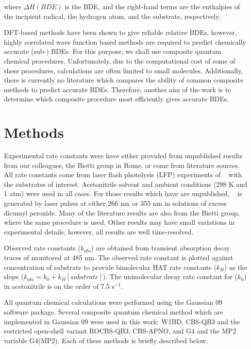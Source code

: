 \noindent where $\Delta H(BDE)$ is the BDE, and the right-hand terms are the enthalpies of the incipient radical, the hydrogen atom, and the substrate, respectively.

DFT-based methods have been shown to give reliable relative BDEs, however, highly correlated wave function based methods are required to predict chemically accurate (sub-\kcalmol) BDEs.\cite{DiLabio1999, Chan2012, Wiberg2014} For this purpose, we shall use composite quantum chemical procedures. Unfortunately, due to the computational cost of some of these procedures, calculations are often limited to small molecules. Additionally, there is currently no literature which compares the ability of common composite methods to predict accurate BDEs. Therefore, another aim of the work is to determine which composite procedure most efficiently gives accurate BDEs.

\section{Methods}

Experimental rate constants were have either provided from unpublished results from our colleagues, the Bietti group in Rome, or come from literature sources.\cite{Bietti2010, Bietti2011, Pischel2001, Salamone2011, Salamone2012, Salamone2012a, Salamone2013, Salamone2015} All rate constants come from laser flash photolysis (LFP) experiments of \cumo~ with the substrates of interest. Acetonitrile solvent and ambient conditions (298 K and 1 atm) were used in all cases. For those results which have are unpublished, \cumo~ is generated by laser pulses at either 266 nm or 355 nm in solutions of excess dicumyl peroxide. Many of the literature results are also from the Bietti group, where the same procedure is used. Other results may have small variations in experimental details, however, all results are well time-resolved.

Observed rate constants ($k_{obs}$) are obtained from transient absorption decay traces of \cumo monitored at 485 nm. The observed rate constant is plotted against concentration of substrate to provide bimolecular HAT rate constants ($k_H$) as the slope ($k_{obs} = k_0 + k_H[substrate]$). The unimolecular decay rate constant for \cumo ($k_0$) in acetonitrile is on the order of 7.5  s$^{-1}$.\cite{Avila1995}

All quantum chemical calculations were performed using the Gaussian 09 software package.\cite{Frisch2009} Several composite quantum chemical method which are implemented in Gaussian 09 were used in this work: W1BD, CBS-QB3 and the restricted open-shell variant ROCBS-QB3, CBS-APNO, and G4 and the MP2 variable G4(MP2). Each of these methods is briefly described below.

